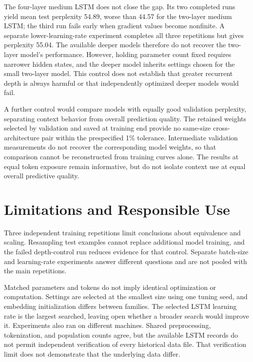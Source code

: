 \documentclass[10pt]{article}
\begin{document}
The four-layer medium LSTM does not close the gap. Its two completed runs yield mean test perplexity 54.89, worse than 44.57 for the two-layer medium LSTM; the third run fails early when gradient values become nonfinite. A separate lower-learning-rate experiment completes all three repetitions but gives perplexity 55.04. The available deeper models therefore do not recover the two-layer model's performance. However, holding parameter count fixed requires narrower hidden states, and the deeper model inherits settings chosen for the small two-layer model. This control does not establish that greater recurrent depth is always harmful or that independently optimized deeper models would fail.

A further control would compare models with equally good validation perplexity, separating context behavior from overall prediction quality. The retained weights selected by validation and saved at training end provide no same-size cross-architecture pair within the prespecified 1\% tolerance. Intermediate validation measurements do not recover the corresponding model weights, so that comparison cannot be reconstructed from training curves alone. The results at equal token exposure remain informative, but do not isolate context use at equal overall predictive quality.

\section{Limitations and Responsible Use}

Three independent training repetitions limit conclusions about equivalence and scaling. Resampling test examples cannot replace additional model training, and the failed depth-control run reduces evidence for that control. Separate batch-size and learning-rate experiments answer different questions and are not pooled with the main repetitions.

Matched parameters and tokens do not imply identical optimization or computation. Settings are selected at the smallest size using one tuning seed, and embedding initialization differs between families. The selected LSTM learning rate is the largest searched, leaving open whether a broader search would improve it. Experiments also ran on different machines. Shared preprocessing, tokenization, and population counts agree, but the available LSTM records do not permit independent verification of every historical data file. That verification limit does not demonstrate that the underlying data differ.
\end{document}
